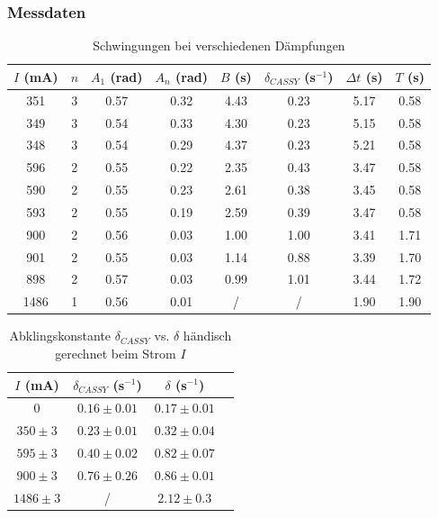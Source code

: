 \documentclass{article}
\begin{document}
\subsubsection{Messdaten}
\begin{table}[H]
    \centering
    \begin{tabular}{|c|c|c|c|c|c|c|c|}
    \hline
    $I$ (mA) & $n$ & $A_1$ (rad) & $A_n$ (rad) & $B$ (s) & $\delta_{CASSY}$ (s$^{-1}$) & $\Delta t$ (s) & $T$ (s) \\
    \hline
    351 & 3 & 0.57 & 0.32 & 4.43 & 0.23 & 5.17 & 0.58 \\
    349 & 3 & 0.54 & 0.33 & 4.30 & 0.23 & 5.15 & 0.58 \\
    348 & 3 & 0.54 & 0.29 & 4.37 & 0.23 & 5.21 & 0.58 \\
    596 & 2 & 0.55 & 0.22 & 2.35 & 0.43 & 3.47 & 0.58 \\
    590 & 2 & 0.55 & 0.23 & 2.61 & 0.38 & 3.45 & 0.58 \\
    593 & 2 & 0.55 & 0.19 & 2.59 & 0.39 & 3.47 & 0.58 \\
    900 & 2 & 0.56 & 0.03 & 1.00 & 1.00 & 3.41 & 1.71 \\
    901 & 2 & 0.55 & 0.03 & 1.14 & 0.88 & 3.39 & 1.70 \\
    898 & 2 & 0.57 & 0.03 & 0.99 & 1.01 & 3.44 & 1.72 \\
    1486 & 1 & 0.56 & 0.01 & / & / & 1.90 & 1.90 \\
    \hline
    \end{tabular}
    \caption{Schwingungen bei verschiedenen Dämpfungen}
    \label{tab:schwingung_dämpfungen}
\end{table}

\begin{table}[H]
    \centering
    \begin{tabular}{|c|c|c|c|}
    \hline
    $I$ (mA) & $\delta_{CASSY}$ (s$^{-1}$) & $\delta$ (s$^{-1}$) \\
    \hline
    0 & $0.16 \pm 0.01$ & $0.17 \pm 0.01$ \\
    $350 \pm 3$ & $0.23 \pm 0.01$ & $0.32 \pm 0.04$ \\
    $595 \pm 3$ & $0.40 \pm 0.02$ & $0.82 \pm 0.07$ \\
    $900 \pm 3$ & $0.76 \pm 0.26$ & $0.86 \pm 0.01$ \\
    $1486 \pm 3$ & / & $2.12 \pm 0.3$ \\
    \hline
    \end{tabular}
    \caption{Abklingskonstante $\delta_{CASSY}$ vs. $\delta$ händisch gerechnet beim Strom $I$}
    \label{tab:dämpfungen_strom}
\end{table}
\end{document}
